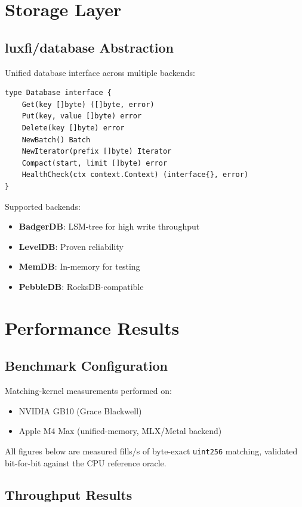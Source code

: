 \documentclass[11pt,a4paper]{article}
\begin{document}
\section{Storage Layer}

\subsection{luxfi/database Abstraction}

Unified database interface across multiple backends:

\begin{lstlisting}
type Database interface {
    Get(key []byte) ([]byte, error)
    Put(key, value []byte) error
    Delete(key []byte) error
    NewBatch() Batch
    NewIterator(prefix []byte) Iterator
    Compact(start, limit []byte) error
    HealthCheck(ctx context.Context) (interface{}, error)
}
\end{lstlisting}

Supported backends:
\begin{itemize}
    \item \textbf{BadgerDB}: LSM-tree for high write throughput
    \item \textbf{LevelDB}: Proven reliability
    \item \textbf{MemDB}: In-memory for testing
    \item \textbf{PebbleDB}: RocksDB-compatible
\end{itemize}

\section{Performance Results}

\subsection{Benchmark Configuration}

Matching-kernel measurements performed on:
\begin{itemize}
    \item NVIDIA GB10 (Grace Blackwell)
    \item Apple M4 Max (unified-memory, MLX/Metal backend)
\end{itemize}
All figures below are measured fills/s of byte-exact \texttt{uint256}
matching, validated bit-for-bit against the CPU reference oracle.

\subsection{Throughput Results}
\end{document}
